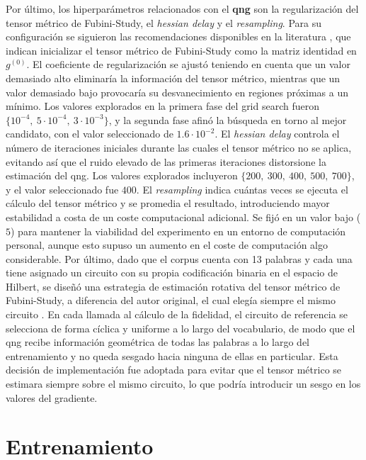 Por último, los hiperparámetros relacionados con el \textbf{\gls{qng}} son la regularización del tensor métrico de Fubini-Study, el \textit{hessian delay} y el \textit{resampling}. Para su configuración se siguieron las recomendaciones disponibles en la literatura \cite{duan_qnspsa_pennylane_2022}, que indican inicializar el tensor métrico de Fubini-Study como la matriz identidad en $g^{(0)}$. El coeficiente de regularización se ajustó teniendo en cuenta que un valor demasiado alto eliminaría la información del tensor métrico, mientras que un valor demasiado bajo provocaría su desvanecimiento en regiones próximas a un mínimo. Los valores explorados en la primera fase del grid search fueron $\{10^{-4},\ 5 \cdot 10^{-4},\ 3 \cdot 10^{-3}\}$, y la segunda fase afinó la búsqueda en torno al mejor candidato, con el valor seleccionado de $1.6 \cdot 10^{-2}$. El \textit{hessian delay} controla el número de iteraciones iniciales durante las cuales el tensor métrico no se aplica, evitando así que el ruido elevado de las primeras iteraciones distorsione la estimación del \gls{qng}. Los valores explorados incluyeron $\{200,\ 300,\ 400,\ 500,\ 700\}$, y el valor seleccionado fue $400$. El \textit{resampling} indica cuántas veces se ejecuta el cálculo del tensor métrico y se promedia el resultado, introduciendo mayor estabilidad a costa de un coste computacional adicional. Se fijó en un valor bajo ($5$) para mantener la viabilidad del experimento en un entorno de computación personal, aunque esto supuso un aumento en el coste de computación algo considerable. Por último, dado que el corpus cuenta con 13 palabras y cada una tiene asignado un circuito con su propia codificación binaria en el espacio de Hilbert, se diseñó una estrategia de estimación rotativa del tensor métrico de Fubini-Study, a diferencia del autor original, el cual elegía siempre el mismo circuito \cite{duan_qnspsa_pennylane_2022}. En cada llamada al cálculo de la fidelidad, el circuito de referencia se selecciona de forma cíclica y uniforme a lo largo del vocabulario, de modo que el \gls{qng} recibe información geométrica de todas las palabras a lo largo del entrenamiento y no queda sesgado hacia ninguna de ellas en particular. Esta decisión de implementación fue adoptada para evitar que el tensor métrico se estimara siempre sobre el mismo circuito, lo que podría introducir un sesgo en los valores del gradiente.

\section{Entrenamiento}

